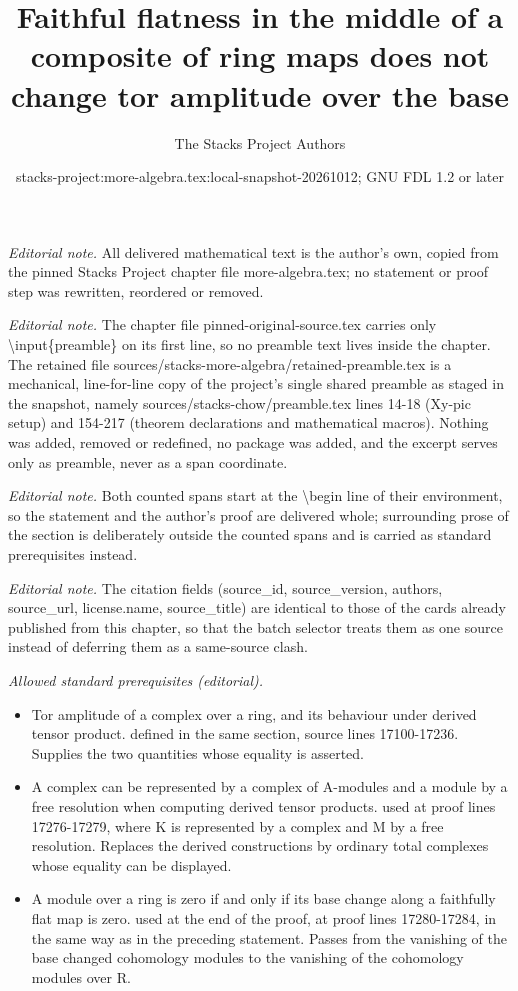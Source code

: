 \documentclass[10pt,a4paper]{amsart}
\title{Faithful flatness in the middle of a composite of ring maps does not change tor amplitude over the base}
\author{The Stacks Project Authors}
\date{stacks-project:more-algebra.tex:local-snapshot-20261012; GNU FDL 1.2 or later}
\theoremstyle{plain}
\theoremstyle{definition}
\theoremstyle{remark}
\numberwithin{equation}{subsection}
\begin{document}
\maketitle
\setcounter{subsection}{1}
\noindent\textit{Editorial note.} All delivered mathematical text is the author's own, copied from the pinned Stacks Project chapter file more-algebra.tex; no statement or proof step was rewritten, reordered or removed.\par\medskip
\noindent\textit{Editorial note.} The chapter file pinned-original-source.tex carries only \textbackslash{}input\{preamble\} on its first line, so no preamble text lives inside the chapter. The retained file sources/stacks-more-algebra/retained-preamble.tex is a mechanical, line-for-line copy of the project's single shared preamble as staged in the snapshot, namely sources/stacks-chow/preamble.tex lines 14-18 (Xy-pic setup) and 154-217 (theorem declarations and mathematical macros). Nothing was added, removed or redefined, no package was added, and the excerpt serves only as preamble, never as a span coordinate.\par\medskip
\noindent\textit{Editorial note.} Both counted spans start at the \textbackslash{}begin line of their environment, so the statement and the author's proof are delivered whole; surrounding prose of the section is deliberately outside the counted spans and is carried as standard prerequisites instead.\par\medskip
\noindent\textit{Editorial note.} The citation fields (source\_id, source\_version, authors, source\_url, license.name, source\_title) are identical to those of the cards already published from this chapter, so that the batch selector treats them as one source instead of deferring them as a same-source clash.\par\medskip
\noindent\textit{Allowed standard prerequisites (editorial).}\begin{itemize}
\item Tor amplitude of a complex over a ring, and its behaviour under derived tensor product. defined in the same section, source lines 17100-17236. Supplies the two quantities whose equality is asserted.
\item A complex can be represented by a complex of A-modules and a module by a free resolution when computing derived tensor products. used at proof lines 17276-17279, where K is represented by a complex and M by a free resolution. Replaces the derived constructions by ordinary total complexes whose equality can be displayed.
\item A module over a ring is zero if and only if its base change along a faithfully flat map is zero. used at the end of the proof, at proof lines 17280-17284, in the same way as in the preceding statement. Passes from the vanishing of the base changed cohomology modules to the vanishing of the cohomology modules over R.
\end{itemize}\medskip
\end{document}

